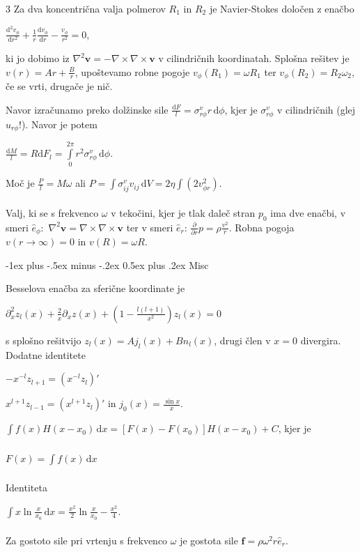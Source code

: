 \documentclass[10pt,landscape]{article}
\makeatletter
\renewcommand{\section}{\@startsection{section}{1}{0mm}%
	{-1ex plus -.5ex minus -.2ex}%
	{0.5ex plus .2ex}%
	{\normalfont\large\bfseries}}
\theoremstyle{definition}
\makeatother
\begin{document}
\begin{multicols}{3}
    Za dva koncentrična valja polmerov \( R_1 \) in \( R_2 \) je Navier-Stokes določen z enačbo

    \( \frac{\mathrm{d} ^2 v_{\phi}}{\mathrm{d} r ^2} + \frac{1}{r} \frac{\mathrm{d} v_{\phi}}{\mathrm{d} r} - \frac{v_{\phi}}{r ^2} = 0 \),

    ki jo dobimo iz \( \nabla ^2 \mathbf{v} = - \nabla \times \nabla \times \mathbf{v} \) v cilindričnih koordinatah. Splošna rešitev je \( v(r) = A r + \frac{B}{r} \), upoštevamo robne pogoje \( v_{\phi} (R_1) = \omega R_1 \) ter \( v_{\phi} (R_2) = R_2 \omega_2  \), če se vrti, drugače je nič.

    Navor izračunamo preko dolžinske sile \( \frac{\mathrm{d} F}{l} = \sigma_{r\phi}^v r \, \mathrm{d} \phi \), kjer je \( \sigma_{r\phi}^v \) v cilindričnih (glej \( u_{r\phi}! \)). Navor je potem

    \( \frac{\mathrm{d} M}{l} = R \mathrm{d} F_l = \int\limits_0^{2\pi}r ^2 \sigma_{r \phi}^v \, \mathrm{d} \phi  \).

    Moč je \( \frac{P}{l} = M \omega \) ali \( P = \int\limits_{}^{} \sigma_{ij} ^v v_{ij} \, \mathrm{d} V = 2 \eta \int\limits_{}^{} (2 v_{\phi r} ^2) \).

    Valj, ki se s frekvenco \( \omega \) v tekočini, kjer je tlak daleč stran \( p_0 \) ima dve enačbi, v smeri \( \hat{e}_{\phi}: \) \( \nabla ^2 \mathbf{v} = \nabla \times \nabla \times \mathbf{v} \) ter v smeri \( \hat{e}_r \): \( \frac{\partial }{\partial r}  p = \rho \frac{v ^2}{r}  \). Robna pogoja \( v(r \to \infty) = 0 \) in \( v(R) = \omega R \).
    
  \section{Misc}

  Besselova enačba za sferične koordinate je

  \( \partial_x ^2 z_l (x) + \frac{2}{x} \partial_x z(x) + \left( 1 - \frac{l (l + 1)}{x ^2} \right) z_l (x) = 0 \)

  s splošno rešitvijo \( z_l (x) = A j_l (x) + B n_l (x) \), drugi člen v \( x = 0 \) divergira. Dodatne identitete

  \( - x ^{- l}  z_{l + 1} = \left(x^{-l} z_l \right)' \)

  \( x^{l + 1} z_{l - 1} = \left(x^{l + 1} z_l \right)' \) in \( j_0 (x) = \frac{\sin x}{x} \).

  \( \int\limits_{}^{} f(x) H(x - x_0 ) \, \mathrm{d} x = \left[ F(x) - F(x_0) \right] H(x - x_0) + C \), kjer je

  \( F(x) = \int\limits_{}^{} f(x) \, \mathrm{d} x \)

  Identiteta

  \( \int\limits_{}^{} x \ln \frac{x}{x_0} \, \mathrm{d} x = \frac{x ^2}{2} \ln \frac{x}{x_0} - \frac{x ^2}{4} \).

  Za gostoto sile pri vrtenju s frekvenco \( \omega \) je gostota sile \( \mathbf{f} = \rho \omega ^2 r \hat{e}_r \).

  
  \columnbreak
  \vfill\null
\end{multicols}
\end{document}
